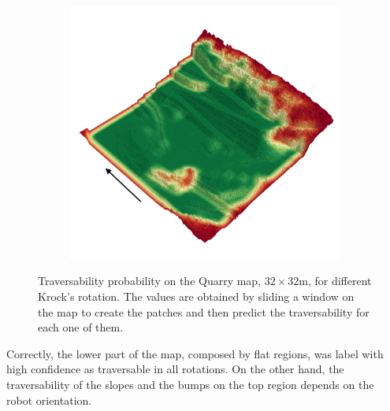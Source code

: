 \documentclass[../document.tex]{subfiles}
\begin{document}
\begin{figure} [htbp]
\begin{subfigure}[b]{0.45\textwidth}
\end{subfigure}
\begin{subfigure}[b]{0.45\textwidth}
    \includegraphics[width=\linewidth]{../img/4/traversability/quarry/-180.png}  
\end{subfigure}
\caption{Traversability probability on the Quarry map, $32\times 32$m, for different Krock's rotation. The values are obtained by sliding a window on the map to create the patches and then predict the traversability for each one of them.}
\end{figure}
 Correctly, the lower part of the map, composed by flat regions, was label with high confidence as traversable in all rotations. On the other hand, the traversability of the  slopes and the bumps on the top region depends on the robot orientation.
 
 
\end{document}
